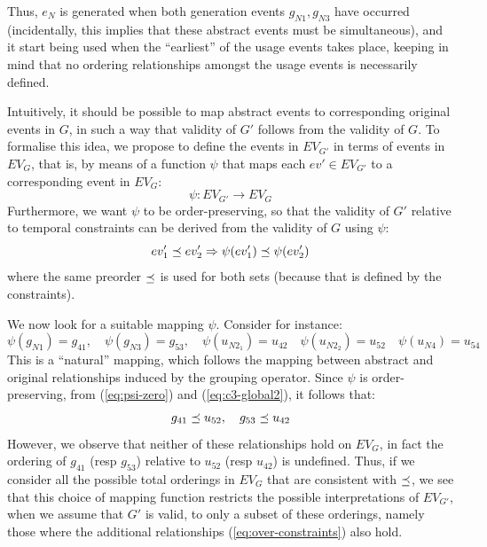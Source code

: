 Thus, $e_{N}$ is generated when both generation events $g_{N1}, g_{N3}$ have occurred (incidentally, this implies that these abstract events must be simultaneous), and it start being used when the ``earliest'' of the usage events takes place, keeping in mind that no ordering relationships amongst the usage events is necessarily defined.

Intuitively, it should be possible to map abstract events to corresponding  original events in $G$, in such a way that validity of $G'$ follows from the validity of $G$.
%
To formalise this idea, we propose to define the  events in $EV_{G'}$ in terms of events in $EV_{G}$, that is, by means of a function $\psi$ that maps each $ev' \in EV_{G'}$ to a corresponding event in $EV_{G}$:
\[ \psi: EV_{G'} \rightarrow EV_{G} \]
Furthermore, we want $\psi$ to be order-preserving, so that the validity of $G'$ relative to temporal constraints can be derived from the validity of $G$ using $\psi$: 
\[ ev_1' \preceq ev_2' \Rightarrow \psi(ev_1') \preceq \psi(ev_2')  \]
where the same preorder $\preceq$ is used for both sets (because that is defined by the constraints).

We now look for a suitable mapping $\psi$. Consider for instance:
\begin{equation}
\psi(g_{N1}) = g_{41} ,  \quad  \psi(g_{N3}) =  g_{53},  \quad   \psi(u_{N2_1}) = u_{42}  \quad \psi(u_{N2_2}) = u_{52} \quad \psi(u_{N4}) = u_{54} \label{eq:psi-zero}
\end{equation}
This is a ``natural'' mapping, which follows the mapping between abstract and original relationships induced by the grouping operator.
Since $\psi$ is order-preserving, from (\ref{eq:psi-zero}) and (\ref{eq:c3-global2}), it follows that:
\begin{equation}
  g_{41} \preceq   u_{52}, \quad  g_{53} \preceq   u_{42}
  \label{eq:over-constraints}
  \end{equation}
However, we observe that neither of these relationships hold on $EV_G$, in fact the ordering of $g_{41}$ (resp $g_{53}$) relative to $u_{52}$ (resp $u_{42}$) is undefined.
Thus, if we consider all the possible total orderings in $EV_G$ that are consistent with $\preceq$, we see that this choice of mapping function restricts the possible interpretations of $EV_{G'}$, when we assume that $G'$ is valid, to only a subset of these orderings, namely those where the additional relationships (\ref{eq:over-constraints}) also hold.

